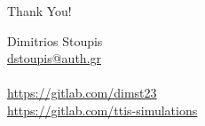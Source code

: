 \begin{frame}
    \begin{center}
        \Huge{Thank You!}
    \end{center}

    \begin{center}
        Dimitrios Stoupis\\
        \href{mailto:dstoupis@auth.gr}{dstoupis@auth.gr}
        \\~\\
        \href{https://gitlab.com/dimst23}{https://gitlab.com/dimst23}\\
        \href{https://gitlab.com/ttis-simulations}{https://gitlab.com/ttis-simulations}
    \end{center}
\end{frame}
